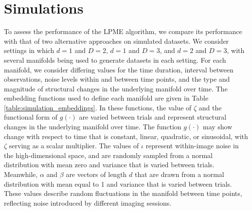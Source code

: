 \documentclass[11pt,reqno]{article}
\theoremstyle{definition}
\begin{document}
\section{Simulations}\label{s:simulations}

To assess the performance of the LPME algorithm, we compare its performance with that of two alternative approaches on simulated datasets. We consider settings in which $d = 1$ and $D = 2$, $d = 1$ and $D = 3$, and $d = 2$ and $D = 3$, with several manifolds being used to generate datasets in each setting. For each manifold, we consider differing values for the time duration, interval between observations, noise levels within and between time points, and the type and magnitude of structural changes in the underlying manifold over time. The embedding functions used to define each manifold are given in Table \ref{table:simulation_embeddings}. In these functions, the value of $\zeta$ and the functional form of $g(\cdot)$ are varied between trials and represent structural changes in the underlying manifold over time. The function $g(\cdot)$ may show change with respect to time that is constant, linear, quadratic, or sinusoidal, with $\zeta$ serving as a scalar multiplier. The values of $\iota$ represent within-image noise in the high-dimensional space, and are randomly sampled from a normal distribution with mean zero and variance that is varied between trials. Meanwhile, $\alpha$ and $\beta$ are vectors of length $d$ that are drawn from a normal distribution with mean equal to 1 and variance that is varied between trials. These values describe random fluctuations in the manifold between time points, reflecting noise introduced by different imaging sessions.
\end{document}
